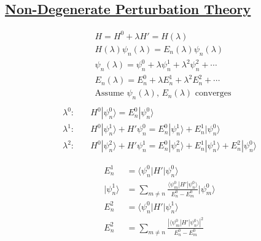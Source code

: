\subsection*{\underline{Non-Degenerate Perturbation Theory}}

\begin{align}
     & H = H^0 + \lambda H' = H(\lambda)                                         \\
     & H(\lambda) \psi_n (\lambda) = E_n (\lambda) \psi_n (\lambda)              \\
     & \psi_n(\lambda) = \psi_n^0 + \lambda \psi_n^1 + \lambda^2 \psi_n^2+\cdots \\
     & E_n(\lambda) = E_n^0 + \lambda E_n^1 + \lambda^2 E_n^2 + \cdots           \\
     & \text{Assume }\psi_n(\lambda), \, E_n(\lambda) \text{ converges}          \\
\end{align}
\begin{align}
    \lambda^0: \quad & H^0|\psi_n^0\rangle = E_n^0 |\psi_n^0\rangle             \\
    \lambda^1: \quad & H^0|\psi_n^1\rangle + H'\psi_n^0 = E_n^0|\psi_n^1\rangle
    + E_n^1|\psi_n^0\rangle                                                     \\
    \lambda^2: \quad & H^0|\psi_n^2\rangle + H'\psi_n^1 = E_n^0|\psi_n^2\rangle
    + E_n^1|\psi_n^1\rangle + E_n^2|\psi_n^0\rangle
\end{align}

\begin{align}
    E_n^1            & = \langle\psi_n^0|H'|\psi_n^0\rangle                            \\
    |\psi_n^1\rangle & = \sum_{m\ne n} \frac{\langle \psi_m^0|H'|
    \psi_n^0\rangle}{E_n^0 - E_m^0} |\psi_m^0\rangle                                   \\
    E_n^2            & = \langle \psi_n^0 | H' | \psi_n^1\rangle                       \\
    E_n^2            & = \sum_{m\ne n} \frac{\left| \langle\psi_m^0|H'|\psi_n^0\rangle
        \right|^2}{E_n^0 - E_m^0}
\end{align}
